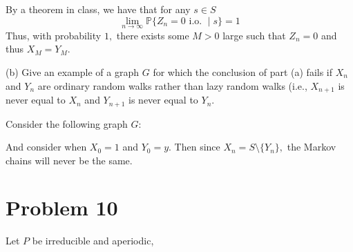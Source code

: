 \documentclass[11pt]{article}
\newcommand{\bbP}{\mathbb{P}}
\begin{document}
\begin{problem}
\begin{solution}
By a theorem in class, we have that for any $s \in S$
\[\lim_{n\to \infty }\bbP\{Z_n = 0 \text{ i.o. }\mid s\} = 1\] Thus, with probability $1,$ there exists some $M>0$ large such that $Z_n = 0$ and thus $X_M = Y_M.$
\end{solution}

(b) Give an example of a graph \( G \) for which the conclusion of part (a) fails if \( X_n \) and \( Y_n \) are ordinary random walks rather than lazy random walks (i.e., \( X_{n+1} \) is never equal to \( X_n \) and \( Y_{n+1} \) is never equal to \( Y_n \).
\begin{solution}
Consider the following graph $G:$
    \begin{center}
\end{center}
And consider when $X_0 = 1$ and $Y_0 = y.$ Then since $X_n = S\setminus\{Y_n\},$ the Markov chains will never be the same.
\end{solution}

\end{problem}

\newpage
\section*{Problem 10}
\begin{problem}
    Let $P$ be irreducible and aperiodic, 
\end{problem}
\end{document}
